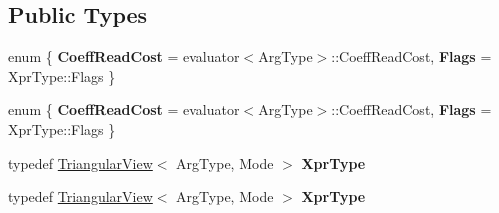 \subsection*{Public Types}
\begin{DoxyCompactItemize}
\item 
\mbox{\label{struct_eigen_1_1internal_1_1unary__evaluator_3_01_triangular_view_3_01_arg_type_00_01_mode_01_4_00_01_iterator_based_01_4_a6c5925e309eae191289af0f27608552a}} 
enum \{ {\bfseries Coeff\+Read\+Cost} = evaluator$<$Arg\+Type$>$\+:\+:Coeff\+Read\+Cost, 
{\bfseries Flags} = Xpr\+Type\+:\+:Flags
 \}
\item 
\mbox{\label{struct_eigen_1_1internal_1_1unary__evaluator_3_01_triangular_view_3_01_arg_type_00_01_mode_01_4_00_01_iterator_based_01_4_a2eba157913d6dc9afd16da3c63545942}} 
enum \{ {\bfseries Coeff\+Read\+Cost} = evaluator$<$Arg\+Type$>$\+:\+:Coeff\+Read\+Cost, 
{\bfseries Flags} = Xpr\+Type\+:\+:Flags
 \}
\item 
\mbox{\label{struct_eigen_1_1internal_1_1unary__evaluator_3_01_triangular_view_3_01_arg_type_00_01_mode_01_4_00_01_iterator_based_01_4_a48f8fbca92bc9115bc1d1cb5b7a228a1}} 
typedef \hyperlink{group___core___module_class_eigen_1_1_triangular_view}{Triangular\+View}$<$ Arg\+Type, Mode $>$ {\bfseries Xpr\+Type}
\item 
\mbox{\label{struct_eigen_1_1internal_1_1unary__evaluator_3_01_triangular_view_3_01_arg_type_00_01_mode_01_4_00_01_iterator_based_01_4_a48f8fbca92bc9115bc1d1cb5b7a228a1}} 
typedef \hyperlink{group___core___module_class_eigen_1_1_triangular_view}{Triangular\+View}$<$ Arg\+Type, Mode $>$ {\bfseries Xpr\+Type}
\end{DoxyCompactItemize}
